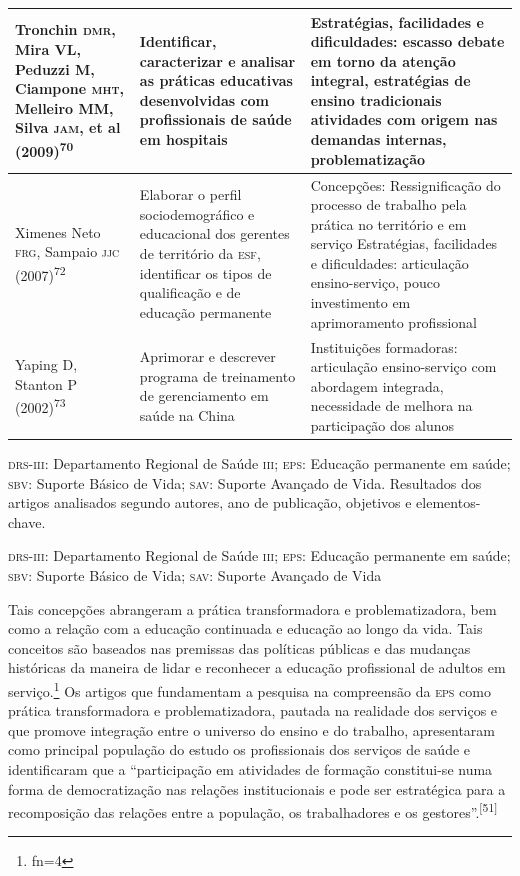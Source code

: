 \documentclass{article}
\makeatletter
\newcommand{\fn}{\afterassignment\fn@aux\count0=}
\newcommand{\fn@aux}{\csname fn\the\count0\endcsname}
\makeatother
\begin{document}
\begin{table}
\begin{xtabular}{ l | l | l }
Tronchin \textsc{dmr}, Mira VL, Peduzzi M, Ciampone \textsc{mht}, Melleiro MM, Silva \textsc{jam}, et al
(2009)\textsuperscript{70}

& Identificar, caracterizar e analisar as práticas educativas desenvolvidas com
profissionais de saúde em hospitais
& Estratégias, facilidades e dificuldades: escasso debate em torno da atenção
integral, estratégias de ensino tradicionais atividades com origem nas demandas
internas, problematização
\\ \hline

Ximenes Neto \textsc{frg}, Sampaio \textsc{jjc} (2007)\textsuperscript{72}

& Elaborar o perfil sociodemográfico e educacional dos gerentes de território da
\textsc{esf}, identificar os tipos de qualificação e de educação permanente
& Concepções: Ressignificação do processo de trabalho pela prática no território
e em serviço Estratégias, facilidades e dificuldades: articulação
ensino-serviço, pouco investimento em aprimoramento profissional
\\ \hline

Yaping D, Stanton P (2002)\textsuperscript{73}

& Aprimorar e descrever programa de treinamento de gerenciamento em saúde na
China
& Instituições formadoras: articulação ensino-serviço com abordagem integrada,
necessidade de melhora na participação dos alunos
\\ \hline

\end{xtabular}
\end{table}

\textsc{drs}-\textsc{iii}: Departamento Regional de Saúde \textsc{iii}; \textsc{eps}: Educação permanente em saúde;
\textsc{sbv}: Suporte Básico de Vida; \textsc{sav}: Suporte Avançado de Vida. Resultados dos artigos analisados segundo autores, ano de publicação,
objetivos e elementos-chave.

\textsc{drs}-\textsc{iii}: Departamento Regional de Saúde \textsc{iii}; \textsc{eps}: Educação permanente em saúde;
\textsc{sbv}: Suporte Básico de Vida; \textsc{sav}: Suporte Avançado de Vida

Tais concepções abrangeram a prática transformadora e problematizadora, bem como
a relação com a educação continuada e educação ao longo da vida. Tais conceitos
são baseados nas premissas das políticas públicas e das mudanças históricas da
maneira de lidar e reconhecer a educação profissional de adultos em serviço.\footnote{\fn4}
Os artigos que fundamentam a pesquisa na compreensão da \textsc{eps} como prática
transformadora e problematizadora, pautada na realidade dos serviços e que
promove integração entre o universo do ensino e do trabalho, apresentaram como
principal população do estudo os profissionais dos serviços de saúde e
identificaram que a “participação em atividades de formação constitui-se numa
forma de democratização nas relações institucionais e pode ser estratégica para
a recomposição das relações entre a população, os trabalhadores e os gestores”.\textsuperscript{[}\textsuperscript{51}\textsuperscript{]}
\end{document}
